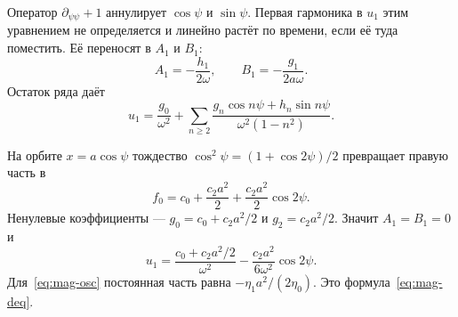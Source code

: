 Оператор $\partial_{\psi\psi}+1$ аннулирует $\cos\psi$ и $\sin\psi$. Первая гармоника в $u_1$ этим уравнением не определяется и линейно растёт по времени, если её туда поместить. Её переносят в $A_1$ и $B_1$:
\begin{equation}
\label{eq:mag-bm-AB}
A_1=-\frac{h_1}{2\omega},\qquad
B_1=-\frac{g_1}{2a\omega}.
\end{equation}
Остаток ряда даёт
\begin{equation}
\label{eq:mag-bm-u1}
u_1=\frac{g_0}{\omega^2}
+\sum_{n\ge 2}\frac{g_n\cos n\psi+h_n\sin n\psi}{\omega^2(1-n^2)}.
\end{equation}

На орбите $x=a\cos\psi$ тождество $\cos^2\psi=(1+\cos 2\psi)/2$ превращает правую часть в
\begin{equation}
\label{eq:mag-bm-f0}
f_0=c_0+\frac{c_2 a^2}{2}+\frac{c_2 a^2}{2}\cos 2\psi.
\end{equation}
Ненулевые коэффициенты --- $g_0=c_0+c_2 a^2/2$ и $g_2=c_2 a^2/2$. Значит $A_1=B_1=0$ и
\begin{equation}
\label{eq:mag-bm-u1-result}
u_1
=\frac{c_0+c_2 a^2/2}{\omega^2}
-\frac{c_2 a^2}{6\omega^2}\cos 2\psi.
\end{equation}
Для~\eqref{eq:mag-osc} постоянная часть равна $-\eta_1 a^2/(2\eta_0)$. Это формула~\eqref{eq:mag-deq}.


